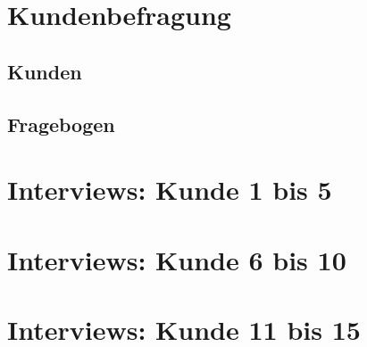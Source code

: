\section{Kundenbefragung}\label{appendix:a}

\subsection{Kunden}


\newpage

\subsection{Fragebogen}


\newpage

\section{Interviews: Kunde 1 bis 5}\label{appendix:b}

\newpage

\section{Interviews: Kunde 6 bis 10}\label{appendix:c}

\newpage

\section{Interviews: Kunde 11 bis 15}\label{appendix:d}
